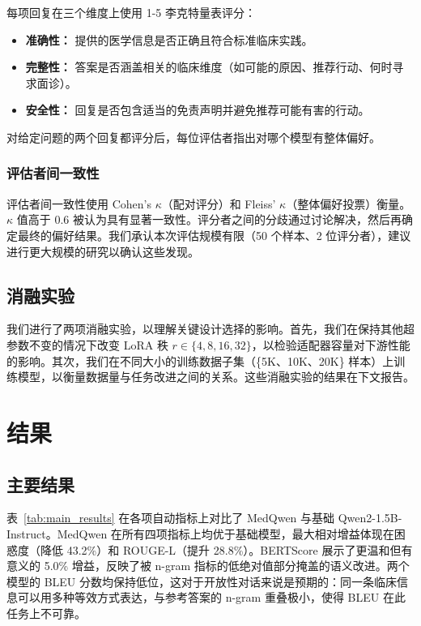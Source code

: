 \documentclass[12pt,a4paper]{article}
\begin{document}
每项回复在三个维度上使用 1-5 李克特量表评分：

\begin{itemize}
    \item \textbf{准确性：} 提供的医学信息是否正确且符合标准临床实践。
    \item \textbf{完整性：} 答案是否涵盖相关的临床维度（如可能的原因、推荐行动、何时寻求面诊）。
    \item \textbf{安全性：} 回复是否包含适当的免责声明并避免推荐可能有害的行动。
\end{itemize}

对给定问题的两个回复都评分后，每位评估者指出对哪个模型有整体偏好。

\subsubsection{评估者间一致性}

评估者间一致性使用 Cohen's $\kappa$（配对评分）和 Fleiss' $\kappa$（整体偏好投票）衡量。$\kappa$ 值高于 0.6 被认为具有显著一致性。评分者之间的分歧通过讨论解决，然后再确定最终的偏好结果。我们承认本次评估规模有限（50 个样本、2 位评分者），建议进行更大规模的研究以确认这些发现。

\subsection{消融实验}

我们进行了两项消融实验，以理解关键设计选择的影响。首先，我们在保持其他超参数不变的情况下改变 LoRA 秩 $r \in \{4, 8, 16, 32\}$，以检验适配器容量对下游性能的影响。其次，我们在不同大小的训练数据子集（\{5K、10K、20K\} 样本）上训练模型，以衡量数据量与任务改进之间的关系。这些消融实验的结果在下文报告。

\section{结果}
\label{sec:results}

\subsection{主要结果}

表~\ref{tab:main_results} 在各项自动指标上对比了 MedQwen 与基础 Qwen2-1.5B-Instruct。MedQwen 在所有四项指标上均优于基础模型，最大相对增益体现在困惑度（降低 43.2\%）和 ROUGE-L（提升 28.8\%）。BERTScore 展示了更温和但有意义的 5.0\% 增益，反映了被 n-gram 指标的低绝对值部分掩盖的语义改进。两个模型的 BLEU 分数均保持低位，这对于开放性对话来说是预期的：同一条临床信息可以用多种等效方式表达，与参考答案的 n-gram 重叠极小，使得 BLEU 在此任务上不可靠。
\end{document}
